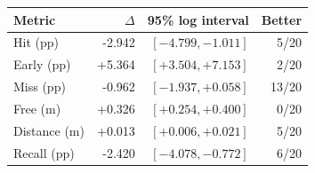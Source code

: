 \begin{tabular}{lrrr}
\toprule Metric & $\Delta$ & 95\% log interval & Better \\
\midrule
Hit (pp) & -2.942 & $[-4.799,-1.011]$ & 5/20 \\
Early (pp) & +5.364 & $[+3.504,+7.153]$ & 2/20 \\
Miss (pp) & -0.962 & $[-1.937,+0.058]$ & 13/20 \\
Free (m) & +0.326 & $[+0.254,+0.400]$ & 0/20 \\
Distance (m) & +0.013 & $[+0.006,+0.021]$ & 5/20 \\
Recall (pp) & -2.420 & $[-4.078,-0.772]$ & 6/20 \\
\bottomrule\end{tabular}
